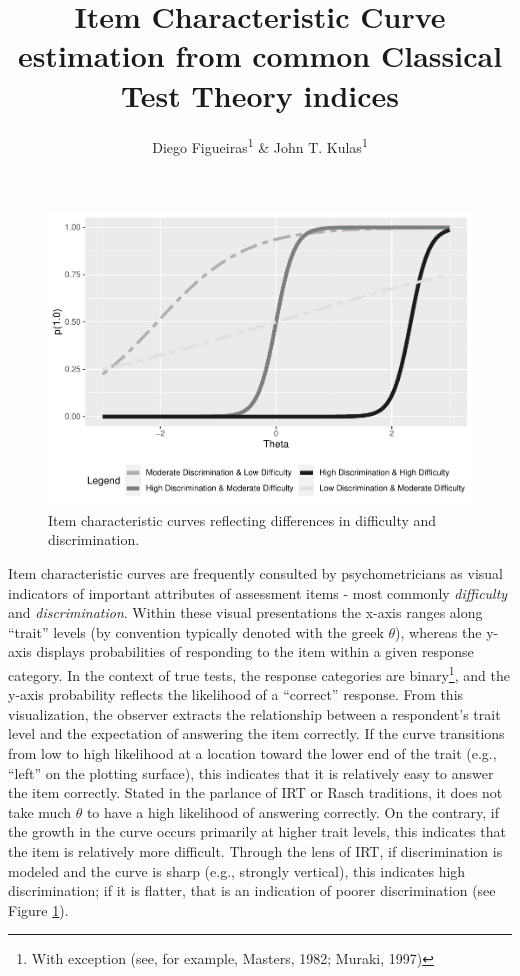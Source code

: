 \documentclass[
  man]{apa6}
\title{Item Characteristic Curve estimation from common Classical Test Theory indices}
\author{Diego Figueiras\textsuperscript{1} \& John T. Kulas\textsuperscript{1}}
\date{}
\affiliation{\vspace{0.5cm}\textsuperscript{1} Montclair State University}
\begin{document}
\maketitle

\begin{figure}
\includegraphics[width=1\linewidth,height=0.8\textheight]{ICC_project_files/figure-latex/example-1} \caption{Item characteristic curves reflecting differences in difficulty and discrimination.}\label{fig:example}
\end{figure}

Item characteristic curves are frequently consulted by psychometricians as visual indicators of important attributes of assessment items - most commonly \emph{difficulty} and \emph{discrimination}. Within these visual presentations the x-axis ranges along ``trait'' levels (by convention typically denoted with the greek \(\theta\)), whereas the y-axis displays probabilities of responding to the item within a given response category. In the context of true tests, the response categories are binary\footnote{With exception (see, for example, Masters, 1982; Muraki, 1997)}, and the y-axis probability reflects the likelihood of a ``correct'' response. From this visualization, the observer extracts the relationship between a respondent's trait level and the expectation of answering the item correctly. If the curve transitions from low to high likelihood at a location toward the lower end of the trait (e.g., ``left'' on the plotting surface), this indicates that it is relatively easy to answer the item correctly. Stated in the parlance of IRT or Rasch traditions, it does not take much \(\theta\) to have a high likelihood of answering correctly. On the contrary, if the growth in the curve occurs primarily at higher trait levels, this indicates that the item is relatively more difficult. Through the lens of IRT, if discrimination is modeled and the curve is sharp (e.g., strongly vertical), this indicates high discrimination; if it is flatter, that is an indication of poorer discrimination (see Figure \ref{fig:example}).
\end{document}
